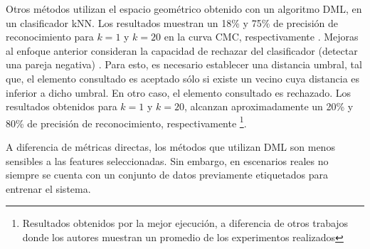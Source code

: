\documentclass[../memoria.tex]{subfiles}
\begin{document}
Otros métodos \cite{weinberger2008fast} utilizan el espacio geométrico obtenido con un algoritmo DML, en un clasificador kNN. Los resultados muestran un 18\% y 75\% de precisión de reconocimiento para $k=1$ y $k=20$ en la curva CMC, respectivamente \cite{hirzer2012relaxed}. Mejoras al enfoque anterior consideran la capacidad de rechazar %
del clasificador (detectar una pareja negativa) \cite{dikmen2011pedestrian}. Para esto, es necesario establecer una distancia umbral, tal que, el elemento consultado es aceptado sólo si existe un vecino cuya distancia es inferior a dicho umbral. En otro caso, el elemento consultado es rechazado. Los resultados obtenidos para $k=1$ y $k=20$, alcanzan aproximadamente un 20\% y 80\% de precisión de reconocimiento, respectivamente \footnote{\label{lmnn-r}Resultados obtenidos por la mejor ejecución, a diferencia de otros trabajos donde los autores muestran un promedio de los experimentos realizados}. %

A diferencia de métricas directas, los métodos que utilizan DML son menos sensibles a las features seleccionadas. Sin embargo, en escenarios reales no siempre se cuenta con un conjunto de datos previamente etiquetados para entrenar el sistema.
\end{document}
